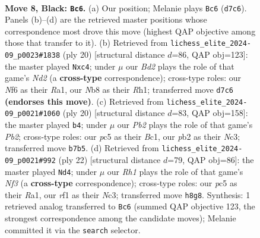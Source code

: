 \documentclass[11pt]{article}
\begin{document}
\begin{figure}[p]\centering
\begin{subfigure}{0.46\textwidth}\centering
\resizebox{\linewidth}{!}{%
\newchessgame
\chessboard[
  setfen={rn1qkb1r/1p1b1ppp/p3pn2/2P5/P1B5/4PN2/1P3PPP/RNBQ1RK1 b kq - 0 8},
  showmover=false,
  pgfstyle=straightmove, color=movearrow, markmove={d7-c6}
]}
\caption{}
\end{subfigure}\hfill
\begin{subfigure}{0.46\textwidth}\centering
\resizebox{\linewidth}{!}{%
\newchessgame
\chessboard[
  setfen={rn1q1rk1/pb2bppp/1p2pn2/8/1Pp5/P3PN2/1B1NBPPP/R2QK2R w KQ - 0 11},
  showmover=false,
  pgfstyle=straightmove, color=movearrow, markmove={d2-c4}
]}
\caption{}
\end{subfigure}
\\[4pt]
\begin{subfigure}{0.46\textwidth}\centering
\resizebox{\linewidth}{!}{%
\newchessgame
\chessboard[
  setfen={r1bq1rk1/1p3ppp/p1n1pn2/2b5/8/P1NBPN2/1P3PPP/R1BQ1RK1 w - - 1 11},
  showmover=false,
  pgfstyle=straightmove, color=movearrow, markmove={b2-b4}
]}
\caption{}
\end{subfigure}\hfill
\begin{subfigure}{0.46\textwidth}\centering
\resizebox{\linewidth}{!}{%
\newchessgame
\chessboard[
  setfen={r2q1rk1/1p3ppp/p2b1n2/2n2b2/8/2N1PN2/PP2BPPP/R1BQK2R w KQ - 0 12},
  showmover=false,
  pgfstyle=straightmove, color=movearrow, markmove={f3-d4}
]}
\caption{}
\end{subfigure}
\caption{\textbf{Move 8, Black: \texttt{Bc6}.} (a) Our position; Melanie plays \texttt{Bc6} (\texttt{d7c6}). Panels (b)--(d) are the retrieved master positions whose correspondence most drove this move (highest QAP objective among those that transfer to it). (b) Retrieved from \texttt{lichess\_elite\_2024-09\_p0023\#1838} (ply 20) [structural distance $d$=86, QAP obj=123]: the master played \texttt{Nxc4}; under $\mu$ our \emph{Bd2} plays the role of that game's \emph{Nd2} (a \textbf{cross-type} correspondence); cross-type roles: our \emph{N}f6 as their \emph{R}a1, our \emph{N}b8 as their \emph{R}h1; transferred move \texttt{d7c6} \textbf{(endorses this move)}. (c) Retrieved from \texttt{lichess\_elite\_2024-09\_p0021\#1060} (ply 20) [structural distance $d$=83, QAP obj=158]: the master played \texttt{b4}; under $\mu$ our \emph{Pb2} plays the role of that game's \emph{Pb2}; cross-type roles: our \emph{p}c5 as their \emph{B}c1, our \emph{p}b2 as their \emph{N}c3; transferred move \texttt{b7b5}. (d) Retrieved from \texttt{lichess\_elite\_2024-09\_p0021\#992} (ply 22) [structural distance $d$=79, QAP obj=86]: the master played \texttt{Nd4}; under $\mu$ our \emph{Rh1} plays the role of that game's \emph{Nf3} (a \textbf{cross-type} correspondence); cross-type roles: our \emph{p}c5 as their \emph{R}a1, our \emph{r}f1 as their \emph{N}c3; transferred move \texttt{h8g8}. Synthesis: 1 retrieved analog transferred to \texttt{Bc6} (summed QAP objective 123, the strongest correspondence among the candidate moves); Melanie committed it via the \texttt{search} selector.}
\label{fig:thought-m15}
\end{figure}
\end{document}

